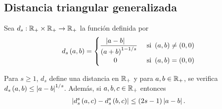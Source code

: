 \subsection{Distancia triangular generalizada}

Sea $d_{s}:\mathbb{R}_{+}\times\mathbb{R}_{+}\to\mathbb{R}_{+}$ la función definida por
\begin{align*}
d_{s}\left( a,b \right) = 
\begin{cases}
\dfrac{\left| a - b \right|\ \ \ }{\left( a + b \right)^{1-1/s}} & \text{ si } \left( a,b \right) \ne \left( 0,0 \right) \\
\qquad 0 &  \text{ si } \left( a,b \right) = \left( 0,0 \right)
\end{cases}
\end{align*}

\begin{lemma}
	Para $s\ge 1$, $d_{s}$ define una distancia en $\mathbb{R}_{+}$ y para $a,b\in\mathbb{R}_{+}$, se verifica $d_{s}\left( a,b \right) \le \left| a-b \right|^{1/s}$.
	Además, si $a,b,c\in\mathbb{R}_{+}$ entonces
	\begin{align*}
	\left| d_{s}^{s}\left( a,c \right)-d_{s}^{s}\left( b,c \right) \right| \le \left( 2s-1 \right)\left| a-b \right|.
	\end{align*}
\end{lemma}

